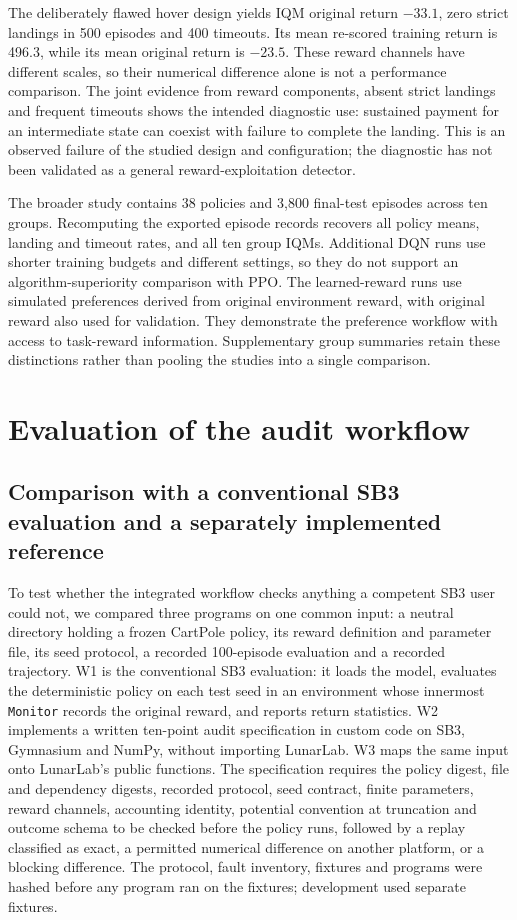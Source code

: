 \documentclass[preprint,12pt]{elsarticle}
\begin{document}
The deliberately flawed hover design yields IQM original return $-33.1$, zero strict landings in 500 episodes and 400 timeouts. Its mean re-scored training return is 496.3, while its mean original return is $-23.5$. These reward channels have different scales, so their numerical difference alone is not a performance comparison. The joint evidence from reward components, absent strict landings and frequent timeouts shows the intended diagnostic use: sustained payment for an intermediate state can coexist with failure to complete the landing. This is an observed failure of the studied design and configuration; the diagnostic has not been validated as a general reward-exploitation detector.

The broader study contains 38 policies and 3,800 final-test episodes across ten groups. Recomputing the exported episode records recovers all policy means, landing and timeout rates, and all ten group IQMs. Additional DQN runs use shorter training budgets and different settings, so they do not support an algorithm-superiority comparison with PPO. The learned-reward runs use simulated preferences derived from original environment reward, with original reward also used for validation. They demonstrate the preference workflow with access to task-reward information. Supplementary group summaries retain these distinctions rather than pooling the studies into a single comparison.

\section{Evaluation of the audit workflow}
\subsection{Comparison with a conventional SB3 evaluation and a separately implemented reference}\label{sec:comparison}
To test whether the integrated workflow checks anything a competent SB3 user could not, we compared three programs on one common input: a neutral directory holding a frozen CartPole policy, its reward definition and parameter file, its seed protocol, a recorded 100-episode evaluation and a recorded trajectory. W1 is the conventional SB3 evaluation: it loads the model, evaluates the deterministic policy on each test seed in an environment whose innermost \texttt{Monitor} records the original reward, and reports return statistics. W2 implements a written ten-point audit specification in custom code on SB3, Gymnasium and NumPy, without importing LunarLab. W3 maps the same input onto LunarLab's public functions. The specification requires the policy digest, file and dependency digests, recorded protocol, seed contract, finite parameters, reward channels, accounting identity, potential convention at truncation and outcome schema to be checked before the policy runs, followed by a replay classified as exact, a permitted numerical difference on another platform, or a blocking difference. The protocol, fault inventory, fixtures and programs were hashed before any program ran on the fixtures; development used separate fixtures.
\end{document}
